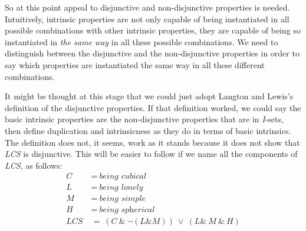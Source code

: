 So at this point appeal to disjunctive and non\nobreakdash-disjunctive properties is needed. Intuitively, intrinsic properties are not only capable of being instantiated in all possible combinations with other intrinsic properties, they are capable of being so instantiated in \textit{the same way} in all these possible combinations. We need to distinguish between the disjunctive and the non\nobreakdash-disjunctive properties in order to say which properties are instantiated the same way in all these different combinations.

It might be thought at this stage that we could just adopt Langton and Lewis's definition of the disjunctive properties. If that definition worked, we could say the basic intrinsic properties are the non\nobreakdash-disjunctive properties that are in\textit{ I}\nobreakdash-sets, then define duplication and intrinsicness as they do in terms of basic intrinsics. The definition does not, it seems, work as it stands because it does not show that \textit{LCS} is disjunctive. This will be easier to follow if we name all the components of \textit{LCS}, as follows:
\begin{align}
\textit{C}~&=~\textit{being cubical} \\
\textit{L}~&=~\textit{being lonely} \\
\textit{M}~&=~\textit{being simple} \\
\textit{H}~&=~\textit{being spherical} \\
\textit{LCS}~&=~(\textit{C}~\&~{\lnot}(\textit{L} \& \textit{M}))~{\vee}~(\textit{L} \&~\textit{M}~\&~\textit{H})
\end{align}

